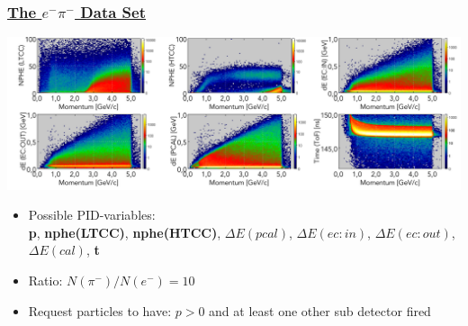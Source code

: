 \documentclass[xcolor=table, xcolor=dvipsnames]{beamer}
\begin{document}
 
 \begin{frame}
  \frametitle{\hyperlink{con}{The $e^{-}\pi^{-}$ Data Set}}
  \label{dataSet}
  \footnotesize
  
    \includegraphics[width=1.02\textwidth,height=0.53\textwidth]{pidCorrPlotsAll.png}
 
  \begin{itemize}
   \item Possible PID-variables: \\ {\bf p}, {\bf nphe(LTCC)}, {\bf nphe(HTCC)}, {\bf $\Delta E(pcal)$}, {\bf $\Delta E(ec:in)$}, {\bf $\Delta E(ec:out)$}, {\bf $\Delta E(cal)$}, {\bf t}
   \item Ratio: $N(\pi^{-}) / N(e^{-}) = 10$
   \item Request particles to have: $p > 0$ and at least one other sub detector fired
  \end{itemize}
 \end{frame}
 
 
 
\end{document}
